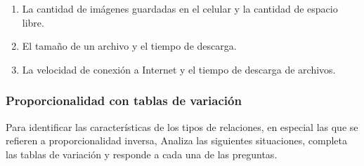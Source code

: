 \documentclass[11pt]{book}
\begin{document}
\begin{enumerate}
\begin{enumerate}
          \item La cantidad de imágenes guardadas en el celular y la cantidad de espacio libre.\\
          \item  El tamaño de un archivo y el tiempo de descarga.\\
          \item La velocidad de conexión a Internet y el tiempo de descarga de archivos.\\
        \end{enumerate}

\end{enumerate}
\subsubsection{Proporcionalidad con tablas de variación}
Para identificar las características de los tipos de relaciones, en
especial las que se refieren a proporcionalidad inversa, Analiza las siguientes situaciones, completa las tablas
de variaci\'on y responde a cada una de las preguntas.
\end{document}
